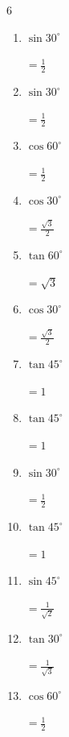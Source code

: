 \begin{multicols}{6}
\begin{enumerate}
  \item $\displaystyle \sin{30^\circ}$

        $\displaystyle =\frac{1}{2}$

  \item $\displaystyle \sin{30^\circ}$

        $\displaystyle =\frac{1}{2}$

  \item $\displaystyle \cos{60^\circ}$

        $\displaystyle =\frac{1}{2}$

  \item $\displaystyle \cos{30^\circ}$

        $\displaystyle =\frac{\sqrt{3}}{2}$

  \item $\displaystyle \tan{60^\circ}$

        $\displaystyle =\sqrt{3}$

  \item $\displaystyle \cos{30^\circ}$

        $\displaystyle =\frac{\sqrt{3}}{2}$

  \item $\displaystyle \tan{45^\circ}$

        $\displaystyle =1$

  \item $\displaystyle \tan{45^\circ}$

        $\displaystyle =1$

  \item $\displaystyle \sin{30^\circ}$

        $\displaystyle =\frac{1}{2}$

\columnbreak %

  \item $\displaystyle \tan{45^\circ}$

        $\displaystyle =1$

  \item $\displaystyle \sin{45^\circ}$

        $\displaystyle =\frac{1}{\sqrt{2}}$

  \item $\displaystyle \tan{30^\circ}$

        $\displaystyle =\frac{1}{\sqrt{3}}$

  \item $\displaystyle \cos{60^\circ}$

        $\displaystyle =\frac{1}{2}$


\end{enumerate}
\end{multicols}
